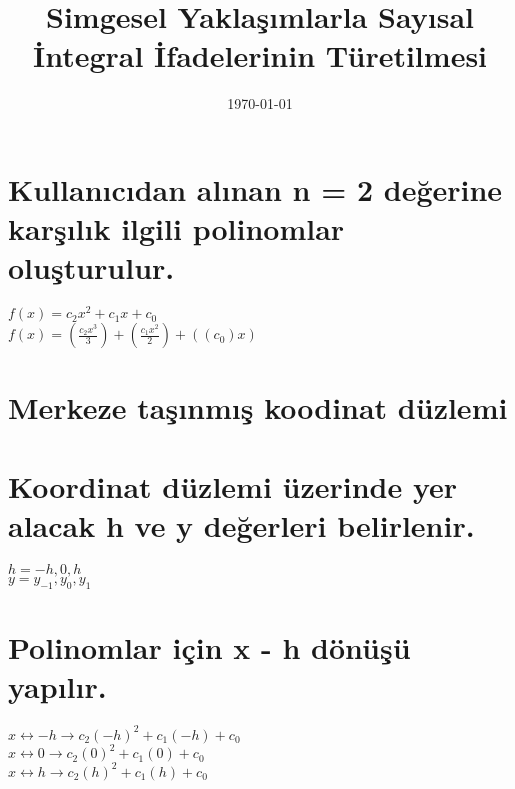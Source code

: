 \documentclass{article}
\begin{document}
\title{Simgesel Yaklaşımlarla Sayısal İntegral İfadelerinin Türetilmesi}
\date{\today}
\author{\@AUTHOR}
\maketitle

\section{Kullanıcıdan alınan n = 2 değerine karşılık ilgili polinomlar oluşturulur.}
$f(x) = c_{2}x^2 + c_{1}x + c_{0}$\\
$f(x) = (\frac{c_{2}x^3}{3}) + (\frac{c_{1}x^2}{2}) + ((c_{0})x)$

\section{Merkeze taşınmış koodinat düzlemi}
\begin{center}
\end{center}

\section{Koordinat düzlemi üzerinde yer alacak h ve y değerleri belirlenir.}
$h = -h,0,h$\\
$y = y_{-1},y_{0},y_{1}$

\section{Polinomlar için x - h dönüşü yapılır.}
$x \leftrightarrow -h \longrightarrow c_{2}(-h)^2 + c_{1}(-h) + c_{0} $\\
$x \leftrightarrow 0 \longrightarrow c_{2}(0)^2 + c_{1}(0) + c_{0}$\\
$x \leftrightarrow h \longrightarrow c_{2}(h)^2 + c_{1}(h) + c_{0}$
\end{document}
